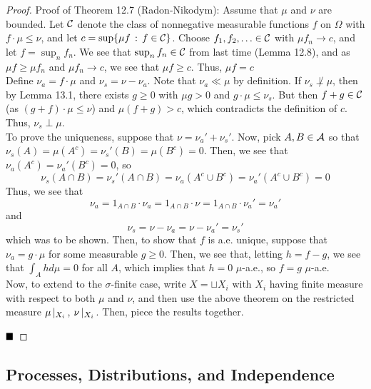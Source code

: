 \begin{proof}{Proof of Theorem 12.7 (Radon-Nikodym):}
    Assume that $\mu$ and $\nu$ are bounded. Let $\cal{C}$ denote the class of nonnegative measurable functions $f$ on $\Omega$ with $f \cdot \mu \leq \nu$, and let $c = \sup\{\mu f \col f \in \cal{C}\}$. Choose $f_1, f_2, \ldots \in \cal{C}$ with $\mu f_n \to c$, and let $f = \sup_{n} f_n$. We see that $\sup_{n} f_n \in \cal{C}$ from last time (Lemma 12.8), and as $\mu f \geq \mu f_n$ and $\mu f_n \to c$, we see that $\mu f \geq c$. Thus, $\mu f = c$\\

    Define $\nu_{a} = f \cdot \mu$ and $\nu_{s} = \nu - \nu_{a}$. Note that $\nu_{a} \ll \mu$ by definition. If $\nu_{s} \not\perp \mu$, then by Lemma 13.1, there exists $g \geq 0$ with $\mu g > 0$ and $g \cdot \mu \leq \nu_{s}$. But then $f + g \in \cal{C}$ (as $(g + f) \cdot \mu \leq \nu$) and $\mu(f + g) > c$, which contradicts the definition of $c$. Thus, $\nu_{s} \perp \mu$.\\

    To prove the uniqueness, suppose that $\nu = \nu_a' + \nu_s'$. Now, pick $A, B \in \cal{A}$ so that $\nu_s(A) = \mu(A^{c}) = \nu_s'(B) = \mu(B^{c}) = 0$. Then, we see that $\nu_a(A^{c}) = \nu_a'(B^{c}) = 0$, so
    \[ \nu_s(A \cap B) = \nu_s'(A \cap B) = \nu_a(A^{c} \cup B^{c}) = \nu_a'(A^{c} \cup B^{c}) = 0 \]
    Thus, we see that
    \[ \nu_a = 1_{A \cap B} \cdot \nu_a = 1_{A \cap B} \cdot \nu = 1_{A \cap B} \cdot \nu_a' = \nu_a' \]
    and 
    \[ \nu_s = \nu - \nu_a = \nu - \nu_a' = \nu_s' \]
    which was to be shown. Then, to show that $f$ is a.e. unique, suppose that $\nu_a = g \cdot \mu$ for some measurable $g \geq 0$. Then, we see that, letting $h = f - g$, we see that $\int_{A} h d\mu = 0$ for all $A$, which implies that $h = 0$ $\mu$-a.e., so $f = g$ $\mu$-a.e.\\

    Now, to extend to the $\sigma$-finite case, write $X = \sqcup X_i$ with $X_i$ having finite measure with respect to both $\mu$ and $\nu$, and then use the above theorem on the restricted measure $\mu \res{X_i}$, $\nu \res{X_i}$. Then, piece the results together. 

    $\qed$


\end{proof}

\subsection*{Processes, Distributions, and Independence}
\sectionspace

